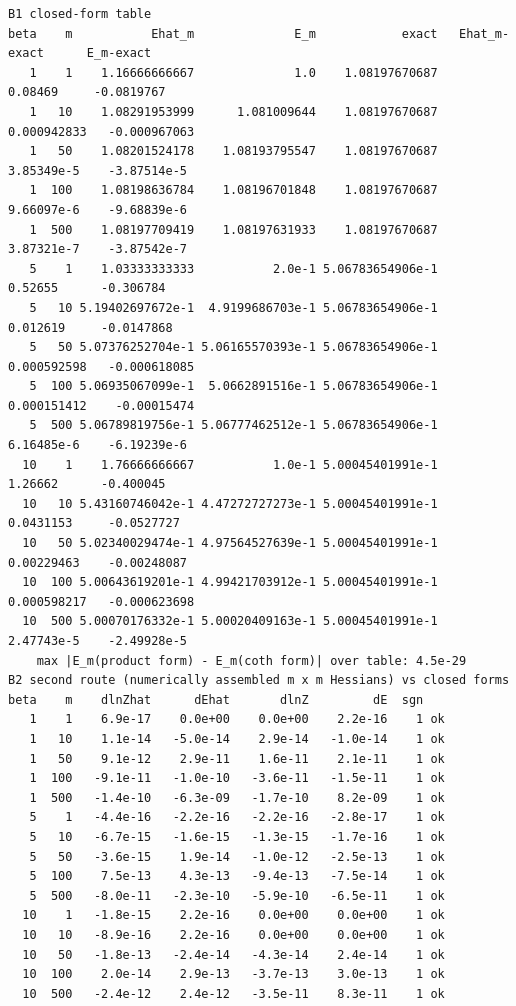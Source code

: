 \documentclass[11pt,a4paper]{article}
\begin{document}
\begin{lstlisting}
B1 closed-form table
beta    m           Ehat_m              E_m            exact   Ehat_m-exact      E_m-exact
   1    1    1.16666666667              1.0    1.08197670687        0.08469     -0.0819767
   1   10    1.08291953999      1.081009644    1.08197670687    0.000942833   -0.000967063
   1   50    1.08201524178    1.08193795547    1.08197670687     3.85349e-5    -3.87514e-5
   1  100    1.08198636784    1.08196701848    1.08197670687     9.66097e-6    -9.68839e-6
   1  500    1.08197709419    1.08197631933    1.08197670687     3.87321e-7    -3.87542e-7
   5    1    1.03333333333           2.0e-1 5.06783654906e-1        0.52655      -0.306784
   5   10 5.19402697672e-1  4.9199686703e-1 5.06783654906e-1       0.012619     -0.0147868
   5   50 5.07376252704e-1 5.06165570393e-1 5.06783654906e-1    0.000592598   -0.000618085
   5  100 5.06935067099e-1  5.0662891516e-1 5.06783654906e-1    0.000151412    -0.00015474
   5  500 5.06789819756e-1 5.06777462512e-1 5.06783654906e-1     6.16485e-6    -6.19239e-6
  10    1    1.76666666667           1.0e-1 5.00045401991e-1        1.26662      -0.400045
  10   10 5.43160746042e-1 4.47272727273e-1 5.00045401991e-1      0.0431153     -0.0527727
  10   50 5.02340029474e-1 4.97564527639e-1 5.00045401991e-1     0.00229463    -0.00248087
  10  100 5.00643619201e-1 4.99421703912e-1 5.00045401991e-1    0.000598217   -0.000623698
  10  500 5.00070176332e-1 5.00020409163e-1 5.00045401991e-1     2.47743e-5    -2.49928e-5
    max |E_m(product form) - E_m(coth form)| over table: 4.5e-29
B2 second route (numerically assembled m x m Hessians) vs closed forms
beta    m    dlnZhat      dEhat       dlnZ         dE  sgn
   1    1    6.9e-17    0.0e+00    0.0e+00    2.2e-16    1 ok
   1   10    1.1e-14   -5.0e-14    2.9e-14   -1.0e-14    1 ok
   1   50    9.1e-12    2.9e-11    1.6e-11    2.1e-11    1 ok
   1  100   -9.1e-11   -1.0e-10   -3.6e-11   -1.5e-11    1 ok
   1  500   -1.4e-10   -6.3e-09   -1.7e-10    8.2e-09    1 ok
   5    1   -4.4e-16   -2.2e-16   -2.2e-16   -2.8e-17    1 ok
   5   10   -6.7e-15   -1.6e-15   -1.3e-15   -1.7e-16    1 ok
   5   50   -3.6e-15    1.9e-14   -1.0e-12   -2.5e-13    1 ok
   5  100    7.5e-13    4.3e-13   -9.4e-13   -7.5e-14    1 ok
   5  500   -8.0e-11   -2.3e-10   -5.9e-10   -6.5e-11    1 ok
  10    1   -1.8e-15    2.2e-16    0.0e+00    0.0e+00    1 ok
  10   10   -8.9e-16    2.2e-16    0.0e+00    0.0e+00    1 ok
  10   50   -1.8e-13   -2.4e-14   -4.3e-14    2.4e-14    1 ok
  10  100    2.0e-14    2.9e-13   -3.7e-13    3.0e-13    1 ok
  10  500   -2.4e-12    2.4e-12   -3.5e-11    8.3e-11    1 ok

\end{lstlisting}
\end{document}
